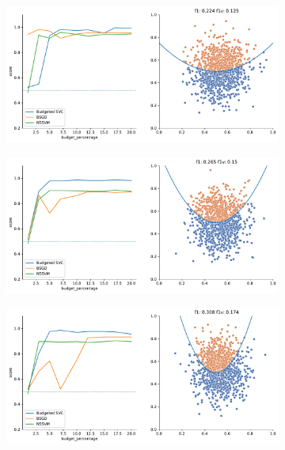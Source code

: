 \begin{figure}
    \begin{subfigure}{.5\textwidth}
        \centering
        \includegraphics[width=\textwidth]{img/comp_new/1.pdf}
    \end{subfigure}%
    \begin{subfigure}{.5\textwidth}
        \centering
        \includegraphics[width=\textwidth]{img/comp_new/2.pdf}
    \end{subfigure}
    \hfill
    \begin{subfigure}{.5\textwidth}
        \centering
        \includegraphics[width=\textwidth]{img/comp_new/3.pdf}

\end{subfigure}
\end{figure}

